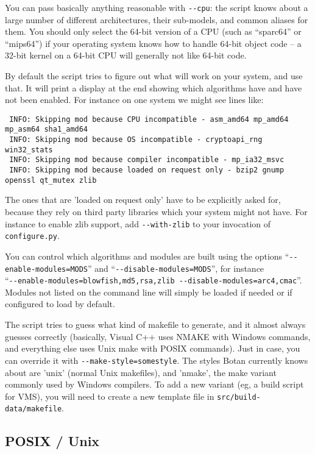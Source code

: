 \documentclass{article}
\newcommand{\filename}[1]{\texttt{#1}}
\begin{document}
You can pass basically anything reasonable with \verb|--cpu|: the
script knows about a large number of different architectures, their
sub-models, and common aliases for them. You should only select the
64-bit version of a CPU (such as ``sparc64'' or ``mips64'') if your
operating system knows how to handle 64-bit object code -- a 32-bit
kernel on a 64-bit CPU will generally not like 64-bit code.

By default the script tries to figure out what will work on your
system, and use that. It will print a display at the end showing which
algorithms have and have not been enabled. For instance on one system
we might see lines like:

\begin{verbatim}
 INFO: Skipping mod because CPU incompatible - asm_amd64 mp_amd64 mp_asm64 sha1_amd64
 INFO: Skipping mod because OS incompatible - cryptoapi_rng win32_stats
 INFO: Skipping mod because compiler incompatible - mp_ia32_msvc
 INFO: Skipping mod because loaded on request only - bzip2 gnump openssl qt_mutex zlib
\end{verbatim}

The ones that are 'loaded on request only' have to be explicitly asked
for, because they rely on third party libraries which your system
might not have. For instance to enable zlib support, add
\verb|--with-zlib| to your invocation of \verb|configure.py|.

You can control which algorithms and modules are built using the
options ``\verb|--enable-modules=MODS|'' and
``\verb|--disable-modules=MODS|'', for instance \\
``\verb|--enable-modules=blowfish,md5,rsa,zlib --disable-modules=arc4,cmac|''.
Modules not listed on the command line will simply be loaded if needed
or if configured to load by default.

The script tries to guess what kind of makefile to generate, and it
almost always guesses correctly (basically, Visual C++ uses NMAKE with
Windows commands, and everything else uses Unix make with POSIX
commands). Just in case, you can override it with
\verb|--make-style=somestyle|. The styles Botan currently knows about
are 'unix' (normal Unix makefiles), and 'nmake', the make variant
commonly used by Windows compilers. To add a new variant (eg, a build
script for VMS), you will need to create a new template file in
\filename{src/build-data/makefile}.

\subsection{POSIX / Unix}
\end{document}
